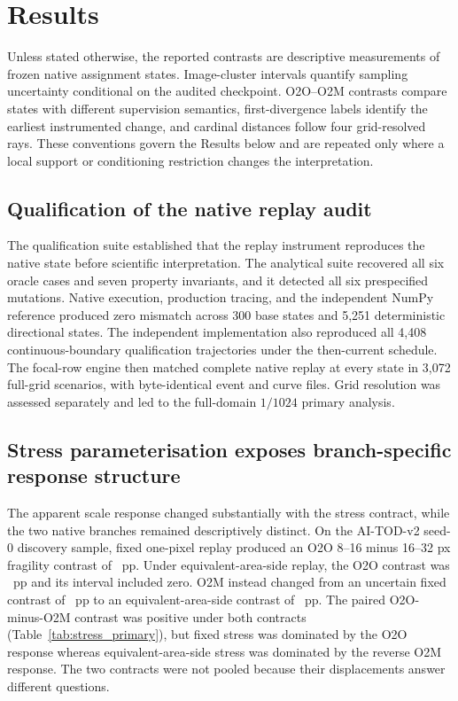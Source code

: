 \section{Results}

Unless stated otherwise, the reported contrasts are descriptive measurements of frozen native assignment states. Image-cluster intervals quantify sampling uncertainty conditional on the audited checkpoint. O2O--O2M contrasts compare states with different supervision semantics, first-divergence labels identify the earliest instrumented change, and cardinal distances follow four grid-resolved rays. These conventions govern the Results below and are repeated only where a local support or conditioning restriction changes the interpretation.

\subsection{Qualification of the native replay audit}

The qualification suite established that the replay instrument reproduces the native state before scientific interpretation. The analytical suite recovered all six oracle cases and seven property invariants, and it detected all six prespecified mutations. Native execution, production tracing, and the independent NumPy reference produced zero mismatch across 300 base states and 5,251 deterministic directional states. The independent implementation also reproduced all 4,408 continuous-boundary qualification trajectories under the then-current schedule. The focal-row engine then matched complete native replay at every state in 3,072 full-grid scenarios, with byte-identical event and curve files. Grid resolution was assessed separately and led to the full-domain $1/1024$ primary analysis.

\subsection{Stress parameterisation exposes branch-specific response structure}

The apparent scale response changed substantially with the stress contract, while the two native branches remained descriptively distinct. On the AI-TOD-v2 seed-0 discovery sample, fixed one-pixel replay produced an O2O 8--16 minus 16--32 px fragility contrast of \FixedOtwoOScalePP\ pp. Under equivalent-area-side replay, the O2O contrast was \NormalizedOtwoOScalePP\ pp and its interval included zero. O2M instead changed from an uncertain fixed contrast of \FixedOtwoMScalePP\ pp to an equivalent-area-side contrast of \NormalizedOtwoMScalePP\ pp. The paired O2O-minus-O2M contrast was positive under both contracts (Table~\ref{tab:stress_primary}), but fixed stress was dominated by the O2O response whereas equivalent-area-side stress was dominated by the reverse O2M response. The two contracts were not pooled because their displacements answer different questions.

